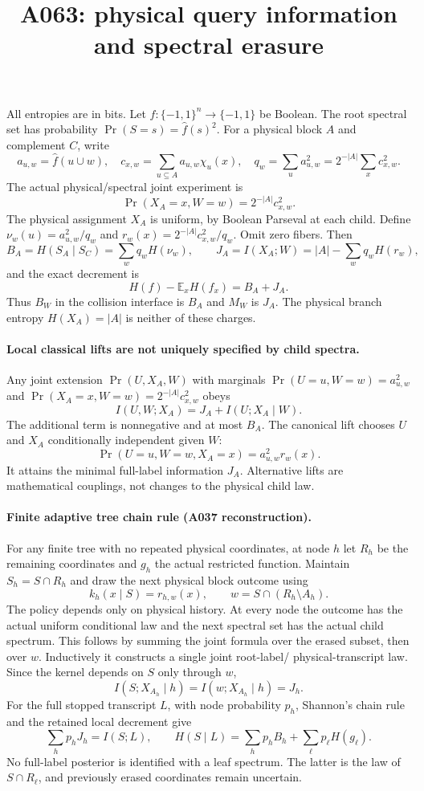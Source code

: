 \documentclass{article}
\begin{document}
\title{A063: physical query information and spectral erasure}
\maketitle
All entropies are in bits. Let $f:\{-1,1\}^n\to\{-1,1\}$ be Boolean.
The root spectral set has probability $\Pr(S=s)=\widehat f(s)^2$.
For a physical block $A$ and complement $C$, write
\[
 a_{u,w}=\widehat f(u\cup w),\quad
 c_{x,w}=\sum_{u\subseteq A}a_{u,w}\chi_u(x),\quad
 q_w=\sum_u a_{u,w}^2=2^{-|A|}\sum_x c_{x,w}^2.
\]
The actual physical/spectral joint experiment is
\[
 \Pr(X_A=x,W=w)=2^{-|A|}c_{x,w}^2.
\]
The physical assignment $X_A$ is uniform, by Boolean Parseval at each child.
Define $\nu_w(u)=a_{u,w}^2/q_w$ and
$r_w(x)=2^{-|A|}c_{x,w}^2/q_w$. Omit zero fibers. Then
\[
 B_A=H(S_A\mid S_C)=\sum_w q_w H(\nu_w),\qquad
 J_A=I(X_A;W)=|A|-\sum_wq_wH(r_w),
\]
and the exact decrement is
\[
 H(f)-\mathbb E_x H(f_x)=B_A+J_A.
\]
Thus $B_W$ in the collision interface is $B_A$ and $M_W$ is $J_A$.
The physical branch entropy $H(X_A)=|A|$ is neither of these charges.

\paragraph{Local classical lifts are not uniquely specified by child spectra.}
Any joint extension $\Pr(U,X_A,W)$ with marginals
$\Pr(U=u,W=w)=a_{u,w}^2$ and
$\Pr(X_A=x,W=w)=2^{-|A|}c_{x,w}^2$ obeys
\[
 I(U,W;X_A)=J_A+I(U;X_A\mid W).
\]
The additional term is nonnegative and at most $B_A$.
The canonical lift chooses $U$ and $X_A$ conditionally independent given $W$:
\[
 \Pr(U=u,W=w,X_A=x)=a_{u,w}^2r_w(x).
\]
It attains the minimal full-label information $J_A$.
Alternative lifts are mathematical couplings, not changes to the physical child law.

\paragraph{Finite adaptive tree chain rule (A037 reconstruction).}
For any finite tree with no repeated physical coordinates, at node $h$ let
$R_h$ be the remaining coordinates and $g_h$ the actual restricted function.
Maintain $S_h=S\cap R_h$ and draw the next physical block outcome using
\[
 k_h(x\mid S)=r_{h,w}(x),\qquad w=S\cap (R_h\setminus A_h).
\]
The policy depends only on physical history. At every node the outcome has
the actual uniform conditional law and the next spectral set has the actual
child spectrum. This follows by summing the joint formula over the erased
subset, then over $w$. Inductively it constructs a single joint root-label/
physical-transcript law. Since the kernel depends on $S$ only through $w$,
\[
 I(S;X_{A_h}\mid h)=I(w;X_{A_h}\mid h)=J_h.
\]
For the full stopped transcript $L$, with node probability $p_h$, Shannon's
chain rule and the retained local decrement give
\[
 \sum_h p_hJ_h=I(S;L),\qquad
 H(S\mid L)=\sum_h p_hB_h+\sum_{\ell}p_\ell H(g_\ell).
\]
No full-label posterior is identified with a leaf spectrum. The latter is
the law of $S\cap R_\ell$, and previously erased coordinates remain uncertain.
\end{document}
